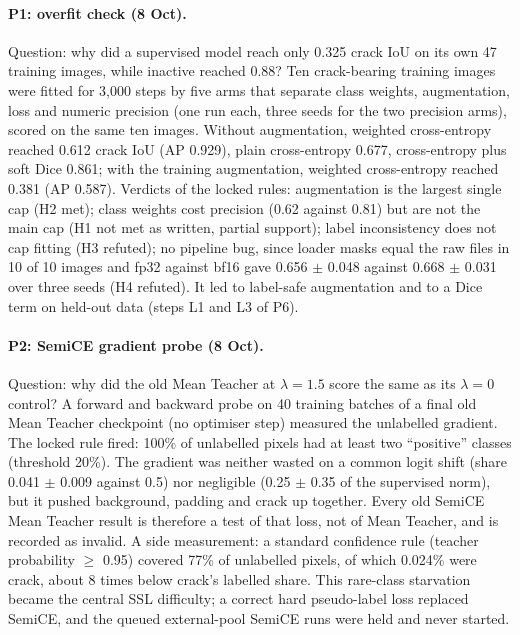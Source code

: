 \paragraph{P1: overfit check (8 Oct).} Question: why did a supervised model reach only 0.325 crack IoU on its own 47 training
images, while inactive reached 0.88? Ten crack-bearing training images were fitted for 3,000 steps by five arms that separate class
weights, augmentation, loss and numeric precision (one run each, three seeds for the two precision arms), scored on the same ten
images. Without augmentation, weighted cross-entropy reached 0.612 crack IoU (AP 0.929), plain cross-entropy 0.677, cross-entropy
plus soft Dice 0.861; with the training augmentation, weighted cross-entropy reached 0.381 (AP 0.587). Verdicts of the locked rules:
augmentation is the largest single cap (H2 met); class weights cost precision (0.62 against 0.81) but are not the main cap (H1 not met
as written, partial support); label inconsistency does not cap fitting (H3 refuted); no pipeline bug, since loader masks equal the
raw files in 10 of 10 images and fp32 against bf16 gave 0.656 $\pm$ 0.048 against 0.668 $\pm$ 0.031 over three seeds (H4 refuted).
It led to label-safe augmentation and to a Dice term on held-out data (steps L1 and L3 of P6).

\paragraph{P2: SemiCE gradient probe (8 Oct).} Question: why did the old Mean Teacher at $\lambda = 1.5$ score the same as its
$\lambda = 0$ control? A forward and backward probe on 40 training batches of a final old Mean Teacher checkpoint (no optimiser
step) measured the unlabelled gradient. The locked rule fired: 100\% of unlabelled pixels had at least two ``positive'' classes
(threshold 20\%). The gradient was neither wasted on a common logit shift (share 0.041 $\pm$ 0.009 against 0.5) nor negligible
(0.25 $\pm$ 0.35 of the supervised norm), but it pushed background, padding and crack up together. Every old SemiCE Mean Teacher
result is therefore a test of that loss, not of Mean Teacher, and is recorded as invalid. A side measurement: a standard
confidence rule (teacher probability $\geq$ 0.95) covered 77\% of unlabelled pixels, of which 0.024\% were crack, about 8 times
below crack's labelled share. This rare-class starvation became the central SSL difficulty; a correct hard pseudo-label loss
\citep{sohn2020fixmatch} replaced SemiCE, and the queued external-pool SemiCE runs were held and never started.

